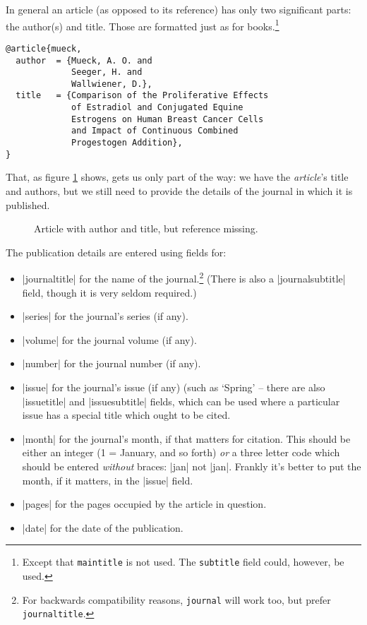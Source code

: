 {In general an article (as opposed to its reference) has only two significant parts: the author(s) and title. Those are formatted just as for books.\footnote{Except that \texttt{maintitle} is not used. The \texttt{subtitle} field could, however, be used.}

\begin{verbatim}
@article{mueck,
  author  = {Mueck, A. O. and
             Seeger, H. and
             Wallwiener, D.},
  title   = {Comparison of the Proliferative Effects
             of Estradiol and Conjugated Equine
             Estrogens on Human Breast Cancer Cells
             and Impact of Continuous Combined
             Progestogen Addition},
}
\end{verbatim}

That, as figure \ref{mueck} shows, gets us only part of the way: we have the \emph{article}'s title and authors, but we still need to provide the details of the journal in which it is published.

\begin{figure}
\caption{Article with author and title, but reference missing.\label{mueck}}
\end{figure}

The publication details are entered using fields for:
\begin{itemize}
\item |journaltitle| for the name of the journal.\footnote{For backwards compatibility reasons, \texttt{journal} will work too, but prefer \texttt{journaltitle}.} (There is also a |journalsubtitle| field, though it is very seldom required.)
\item |series| for the journal's series (if any).
\item |volume| for the journal volume (if any).
\item |number| for the journal number (if any).
\item |issue| for the journal's issue (if any) (such as `Spring' -- there are also |issuetitle| and |issuesubtitle| fields, which can be used where a particular issue has a special title which ought to be cited.
\item |month| for the journal's month, if that matters for citation. This should be either an integer (1 = January, and so forth) \emph{or} a three letter code which should be entered \emph{without} braces: |jan| not |{jan}|. Frankly it's better to put the month, if it matters, in the |issue| field.
\item |pages| for the pages occupied by the article in question.
\item |date| for the date of the publication.
\end{itemize}

}
